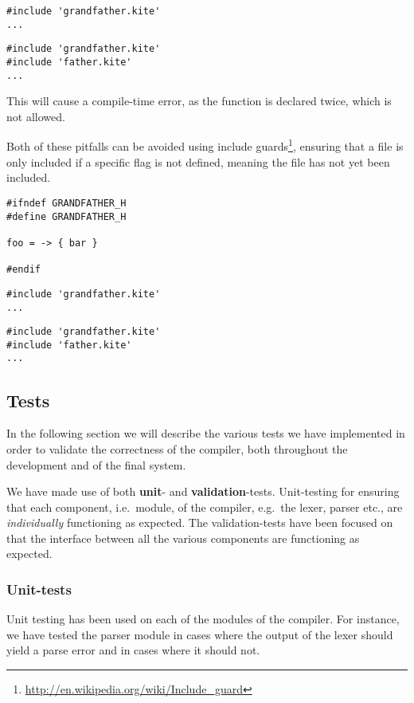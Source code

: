 \begin{lstlisting}[caption=\code{father.kite}]
#include 'grandfather.kite'
...
\end{lstlisting}

\begin{lstlisting}[caption=\code{child.kite}]
#include 'grandfather.kite'
#include 'father.kite'
...
\end{lstlisting}

This will cause a compile-time error, as the function  is declared twice, which is not allowed.

Both of these pitfalls can be avoided using include guards\footnote{\url{http://en.wikipedia.org/wiki/Include_guard}}, ensuring that a file is only included if a specific flag is not defined, meaning the file has not yet been included.

\begin{lstlisting}[caption=\code{grandfather.kite}]
#ifndef GRANDFATHER_H
#define GRANDFATHER_H

foo = -> { bar }

#endif
\end{lstlisting}

\begin{lstlisting}[caption=\code{father.kite}]
#include 'grandfather.kite'
...
\end{lstlisting}

\begin{lstlisting}[caption=\code{child.kite}]
#include 'grandfather.kite'
#include 'father.kite'
...
\end{lstlisting}


\subsection{Tests}
In the following section we will describe the various tests we have implemented in order to validate the correctness of the compiler, both throughout the development and of the final system.

We have made use of both \textbf{unit}- and \textbf{validation}-tests. Unit-testing for ensuring that each component, i.e.\ module, of the compiler, e.g.\ the lexer, parser etc., are \emph{individually} functioning as expected. The validation-tests have been focused on that the interface between all the various components are functioning as expected.

\subsubsection{Unit-tests}
Unit testing has been used on each of the modules of the compiler. For instance, we have tested the parser module in cases where the output of the lexer should yield a parse error and in cases where it should not.


